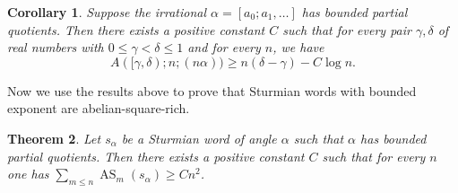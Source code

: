 \documentclass[11pt,reqno]{amsart}
\numberwithin{equation}{section}
\theoremstyle{plain}
\newtheorem{theorem}{Theorem}
\newtheorem{corollary}[theorem]{Corollary}
\theoremstyle{definition}
\theoremstyle{remark}
\DeclareMathOperator{\AS}{AS}
\newcommand{\ass}[2]{\AS_{#2}(#1)}
\begin{document}
\begin{corollary}\label{cor:disc}
  Suppose the irrational $\alpha=[a_0;a_1,\ldots]$ has bounded partial quotients. Then there exists a positive constant $C$ such that for every pair $\gamma,\delta$ of real numbers with $0\leq \gamma<\delta\leq 1$ and for every $n$, we have
 \[
A([\gamma,\delta);n;(n\alpha)) \geq  n(\delta-\gamma) - C\log n.
 \]

\end{corollary}

Now we use the results above to prove that Sturmian words with bounded exponent are abelian-square-rich.

\begin{theorem}\label{theor:lin}
 Let $s_{\alpha}$ be a Sturmian word of angle $\alpha$ such that $\alpha$ has bounded partial quotients. Then there exists a positive constant $C$ such that for every $n$ one has $\sum_{m\leq n} \ass{s_{\alpha}} {m}\geq Cn^2$.
\end{theorem}
\end{document}
